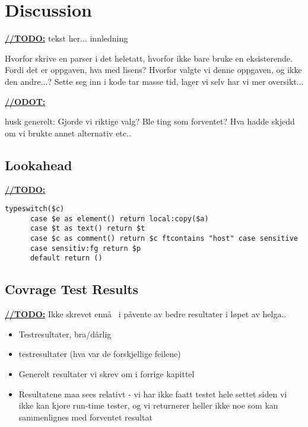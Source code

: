 \chapter{Discussion}
\underline{\textbf{\LARGE //TODO:}} tekst her... innledning

Hvorfor skrive en parser i det heletatt, hvorfor ikke bare bruke en eksisterende. Fordi det er oppgaven, hva med lisens? Hvorfor valgte vi denne oppgaven, og ikke den andre...? Sette seg inn i kode tar masse tid, lager vi selv har vi mer oversikt...

\underline{\textbf{\LARGE //ODOT:}}

husk generelt: Gjorde vi riktige valg? Ble ting som forventet? Hva hadde skjedd om vi brukte annet alternativ etc..

















\section{Lookahead}
\underline{\textbf{\LARGE //TODO:}}
\begin{verbatim}
typeswitch($c) 
      case $e as element() return local:copy($a)
      case $t as text() return $t
      case $c as comment() return $c ftcontains "host" case sensitive
      case sensitiv:fg return $p
      default return ()
\end{verbatim}

\section{Covrage Test Results}
\label{sect:discussion:coverageResults}
\underline{\textbf{\LARGE //TODO:}} Ikke skrevet enn\aa~ i p\aa vente av bedre resultater i l\o pet av helga..
\begin{itemize}
\item Testresultater, bra/d\aa rlig
\item testresultater (hva var de forskjellige feilene)
\item Generelt resultater vi skrev om i forrige kapittel
\item Resultatene maa sees relativt - vi har ikke faatt testet hele settet siden
vi ikke kan kjore run-time tester, og vi returnerer heller ikke noe som kan
sammenlignes med forventet resultat
\end{itemize}

